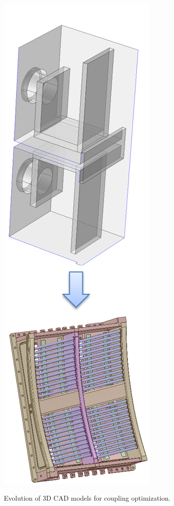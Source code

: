 \begin{marginfigure}
	\centering
	\includegraphics[width=0.8\linewidth]{figures/chap3/WEST_ICRH/WEST_front_face_evolution2}
	\caption{Evolution of 3D CAD models for coupling optimization.}
	\label{fig:westfrontfaceevolution2}
\end{marginfigure}

